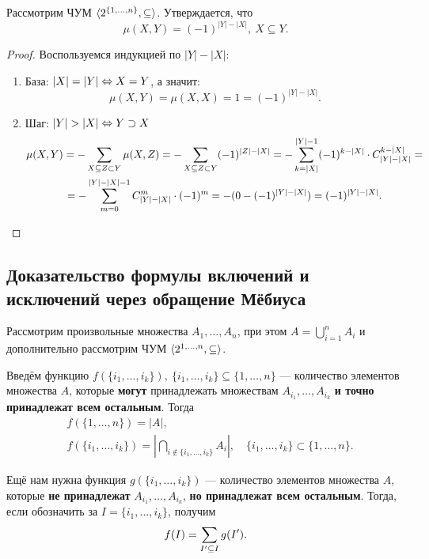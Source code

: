 \begin{theorem}
	Рассмотрим ЧУМ $\langle2^{\{1, \ldots, n\}}, \subseteq\rangle$. Утверждается, что
	\[
		\mu(X, Y) = (-1)^{|Y| - |X|},\ X \subseteq Y.
	\]
\end{theorem}

\begin{proof}
	Воспользуемся индукцией по $|Y| - |X|$:
	\begin{enumerate}
		\item База: $|X| = |Y| \Leftrightarrow X = Y$, а значит:
		\[
			\mu(X, Y) = \mu(X, X) = 1 = (-1)^{|Y| - |X|}.
		\]
		
		\item Шаг: $|Y| > |X| \Leftrightarrow Y \supset X$
		\begin{multline*}
			\mu(X, Y) = -\sum\limits_{X \subseteq Z \subset Y} \mu(X, Z) = -\sum\limits_{X \subseteq Z \subset Y} (-1)^{|Z| - |X|} = -\sum\limits_{k = |X|}^{|Y| - 1} (-1)^{k - |X|} \cdot C_{|Y| - |X|}^{k - |X|} =
			\\
			= -\sum\limits_{m = 0}^{|Y| - |X| - 1} C_{|Y| - |X|}^m \cdot (-1)^m = -(0 - (-1)^{|Y| - |X|}) = (-1)^{|Y| - |X|}.
		\end{multline*}
	\end{enumerate}
\end{proof}

\subsection{Доказательство формулы включений и исключений через обращение Мёбиуса}

Рассмотрим произвольные множества $A_1, \ldots, A_n$, при этом $A = \bigcup_{i = 1}^n A_i$ и  дополнительно рассмотрим ЧУМ $\langle2^{1, \ldots, n}, \subseteq\rangle$.

Введём функцию $f(\{i_1, \ldots, i_k\}),\ \{i_1, \ldots, i_k\} \subseteq \{1, \ldots, n\}$ --- количество элементов множества $A$, которые \textbf{могут} принадлежать множествам $A_{i_1}, \ldots, A_{i_k}$ \textbf{и точно принадлежат всем остальным}. Тогда
\begin{align*}
	&{f(\{1, \ldots, n\}) = |A|,}
	\\
	&{f(\{i_1, \ldots, i_k\}) = \left|\bigcap_{i \notin \{i_1, \ldots, i_k\}} A_i\right|,\quad \{i_1, \ldots, i_k\} \subset \{1, \ldots, n\}.}
\end{align*}

Ещё нам нужна функция $g(\{i_1, \ldots, i_k\})$ --- количество элементов множества $A$, которые \textbf{не принадлежат} $A_{i_1}, \ldots, A_{i_k}$, \textbf{но принадлежат всем остальным}. Тогда, если обозначить за $I = \{i_1, \ldots, i_k\}$, получим
\[
	f(I) = \sum\limits_{I' \subseteq I} g(I').
\]

